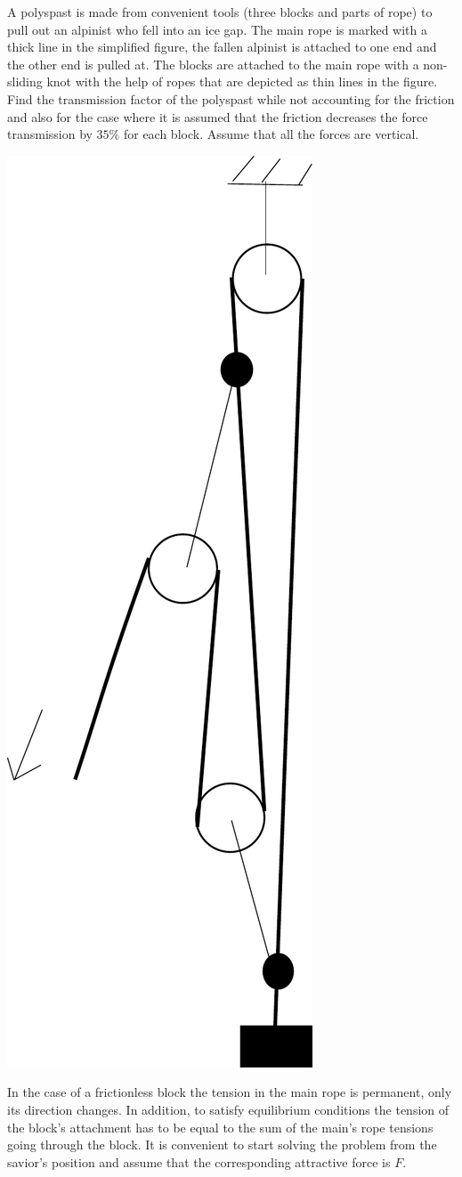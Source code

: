 {\ifEngStatement
A polyspast is made from convenient tools (three blocks and parts of rope) to pull out an alpinist who fell into an ice gap. The main rope is marked with a thick line in the simplified figure, the fallen alpinist is attached to one end and the other end is pulled at. The blocks are attached to the main rope with a non-sliding knot with the help of ropes that are depicted as thin lines in the figure. Find the transmission factor of the polyspast while not accounting for the friction and also for the case where it is assumed that the friction decreases the force transmission by $35\percent$ for each block. Assume that all the forces are vertical.
\begin{center}
\includegraphics[width=0.25\linewidth]{2014-v3g-06-Polyspast}
\end{center}
\fi


\ifEngHint
In the case of a frictionless block the tension in the main rope is permanent, only its direction changes. In addition, to satisfy equilibrium conditions the tension of the block’s attachment has to be equal to the sum of the main’s rope tensions going through the block. It is convenient to start solving the problem from the savior’s position and assume that the corresponding attractive force is $F$.
\fi


}
